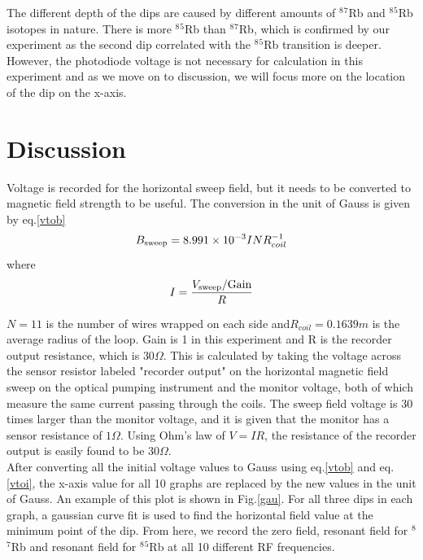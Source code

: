 \documentclass[prb,preprint]{revtex4-1}
\begin{document}
The different depth of the dips are caused by different amounts of $^8$$^7$Rb and $^8$$^5$Rb isotopes in nature. There is more $^8$$^5$Rb than $^8$$^7$Rb, which is confirmed by our experiment as the second dip correlated with the  $^8$$^5$Rb transition is deeper. However, the photodiode voltage is not necessary for calculation in this experiment and as we move on to discussion, we will focus more on the location of the dip on the x-axis.\\

\section{Discussion}
Voltage is recorded for the horizontal sweep field, but it needs to be converted to magnetic field strength to be useful. The conversion in the unit of Gauss is given by eq.\ref{vtob}
\begin{equation}
B_{\textnormal{sweep}}=8.991\times10^{-3} I N R_{coil}^{-1}
\label{vtob}
\end{equation}
\vspace*{-0.25cm}
where
\vspace*{-0.5cm}
\begin{equation}
I=\frac{V_{\textnormal{sweep}}/{\textrm{Gain}}}{R}
\label{vtoi}
\end{equation}


$N=11$ is the number of wires wrapped on each side and$R_{coil}=0.1639m$ is the average radius of the loop. Gain is 1 in this experiment and R is the recorder output resistance, which is $30 \Omega$. This is calculated by taking the voltage across the sensor resistor labeled "recorder output" on the horizontal magnetic field sweep on the optical pumping instrument and the monitor voltage, both of which measure the same current passing through the coils. The sweep field voltage is 30 times larger than the monitor voltage, and it is given that the monitor has a sensor resistance of $1 \Omega$. Using Ohm's law of $V=IR$, the resistance of the recorder output is easily found to be $30 \Omega$. \\

After converting all the initial voltage values to Gauss using eq.\ref{vtob} and eq.\ref{vtoi}, the x-axis value for all 10 graphs are replaced by the new values in the unit of Gauss. An example of this plot is shown in Fig.\ref{gau}. For all three dips in each graph, a gaussian curve fit is used to find the horizontal field value at the minimum point of the dip. From here, we record the zero field, resonant field for $^8$$^7$Rb and resonant field for $^8$$^5$Rb at all 10 different RF frequencies.\\
\end{document}
